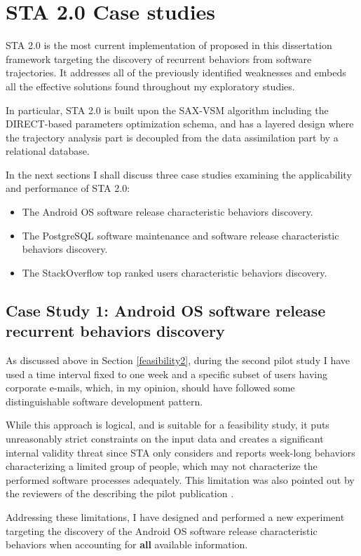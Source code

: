 \section{STA 2.0 Case studies}
STA 2.0 is the most current implementation of proposed in this dissertation framework targeting the discovery of recurrent behaviors from software trajectories. It addresses all of the previously identified weaknesses and embeds all the effective solutions found throughout my exploratory studies. 

In particular, STA 2.0 is built upon the SAX-VSM algorithm including the DIRECT-based parameters optimization schema, and has a layered design where the trajectory analysis part is decoupled from the data assimilation part by a relational database.

In the next sections I shall discuss three case studies examining the applicability and performance of STA 2.0:
\begin{itemize}
 \item The Android OS software release characteristic behaviors discovery.
 \item The PostgreSQL software maintenance and software release characteristic behaviors discovery.
 \item The StackOverflow top ranked users characteristic behaviors discovery.
\end{itemize}

\subsection{Case Study 1: Android OS software release recurrent behaviors discovery}\label{case1}
As discussed above in Section \ref{feasibility2}, during the second pilot study I have used a time interval fixed to one week and a specific subset of users having corporate e-mails, which, in my opinion, should have followed some distinguishable software development pattern. 

While this approach is logical, and is suitable for a feasibility study, it puts unreasonably strict constraints on the input data and creates a significant internal validity threat since STA only considers and reports week-long behaviors characterizing a limited group of people, which may not characterize the performed software processes adequately. This limitation was also pointed out by the reviewers of the describing the pilot publication \cite{csdl2-11-10}.

Addressing these limitations, I have designed and performed a new experiment targeting the discovery of the Android OS software release characteristic behaviors when accounting for \textbf{all} available information.

